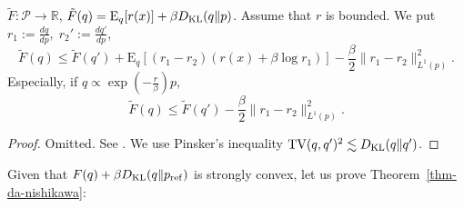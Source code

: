 \begin{lem}
    \label{lem:da-convex}
  $\tilde{F}:\mathcal{P}\to \mathbb{R}$, $\tilde{F}(q) = \mathrm{E}_q[r(x)] + \beta D_{\mathrm{KL}}(q\|p)$.
  Assume that 
  $r$ is bounded. We put $r_1:=\frac{dq}{dp}, \; r_2' := \frac{dq'}{dp}$,
  \begin{equation}
    \tilde{F}(q) \leq \tilde{F}(q') + \mathrm{E}_q[(r_1-r_2)(r(x) + \beta \log r_1)] - \frac{\beta}{2}\|r_1-r_2\|^2_{L^1(p)}.
  \end{equation}
  Especially, if $q \propto \exp (-\frac{r}{\beta})p$, 
  \begin{equation}
    \tilde{F}(q) \leq \tilde{F}(q') - \frac{\beta}{2}\|r_1-r_2\|^2_{L^1(p)}.
  \end{equation}
\end{lem}
\begin{proof}
Omitted. See \cite{NEURIPS2021_a34e1ddb}. We use Pinsker's inequality
$\mathrm{TV}(q,q')^2 \lesssim D_{\mathrm{KL}}(q\|q')$.
\end{proof}
Given that $F(q) + \beta D_{\mathrm{KL}}(q\|p_{\rm{ref}})$ is strongly convex, let us prove Theorem~\ref{thm-da-nishikawa}:
